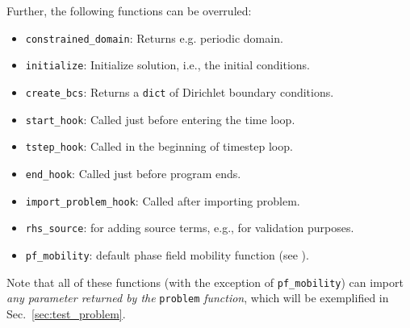 \documentclass[a4paper,10pt]{article}
\begin{document}
Further, the following functions can be overruled:
\begin{itemize}
\item \texttt{constrained\_domain}: Returns e.g. periodic domain.
\item \texttt{initialize}: Initialize solution, i.e., the initial conditions.
\item \texttt{create\_bcs}: Returns a \texttt{dict} of Dirichlet boundary conditions.
\item \texttt{start\_hook}: Called just before entering the time loop.
\item \texttt{tstep\_hook}: Called in the beginning of timestep loop.
\item \texttt{end\_hook}: Called just before program ends.
\item \texttt{import\_problem\_hook}: Called after importing problem.
\item \texttt{rhs\_source}: for adding source terms, e.g., for validation purposes.
\item \texttt{pf\_mobility}: default phase field mobility function (see \cite{linga2018b}).
\end{itemize}
Note that all of these functions (with the exception of \texttt{pf\_mobility}) can import \emph{any parameter returned by the} \texttt{problem} \emph{function}, which will be exemplified in Sec.\ \ref{sec:test_problem}.
\end{document}
